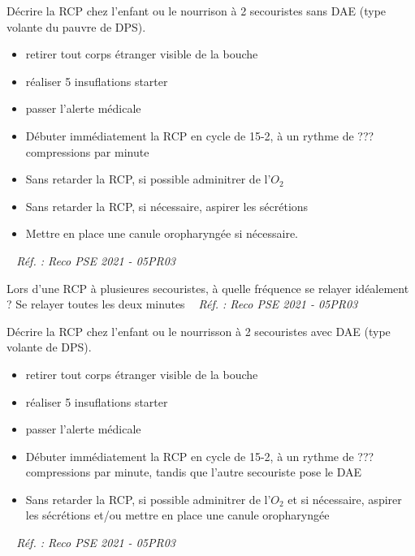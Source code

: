\documentclass[grid,avery5371,landscape]{flashcards}
\makeatletter
\newcounter{nocarte}
\newcommand{\categ}[1]{%
  \def\@categ{#1}%
  \setcounter{nocarte}{0}%
}
\newcommand{\source}[1]{%
  \medskip
  \itshape%
   ~ \hfill Réf. : #1}
\makeatother
\begin{document}
\color[HTML]{003273}
\categ{PSE}
\begin{flashcard}[CAT]{
 Décrire la RCP chez l'enfant ou le nourrison à 2 secouristes sans DAE (type volante du pauvre de DPS).   }
  \begin{itemize} \item retirer tout corps étranger visible de la bouche \item réaliser 5 insuflations starter \item passer l'alerte médicale \item Débuter immédiatement la RCP en cycle de 15-2, à un rythme de ??? compressions par minute \item Sans retarder la RCP, si possible adminitrer de l'$O_2$ \item Sans retarder la RCP, si nécessaire, aspirer les sécrétions \item Mettre en place une canule oropharyngée si nécessaire. \end{itemize}
  \source{Reco PSE 2021 - 05PR03}
\end{flashcard}


\color[HTML]{003273}
\categ{PSE}
\begin{flashcard}[CAT]{
 Lors d'une RCP à plusieures secouristes, à quelle fréquence se relayer idéalement ?   }
  Se relayer toutes les deux minutes
  \source{Reco PSE 2021 - 05PR03}
\end{flashcard}


\color[HTML]{003273}
\categ{PSE}
\begin{flashcard}[CAT]{
 Décrire la RCP chez l'enfant ou le nourrisson à 2 secouristes avec DAE (type volante de DPS).   }
  \begin{itemize} 
\item retirer tout corps étranger visible de la bouche 
\item réaliser 5 insuflations starter 
\item passer l'alerte médicale 
\item Débuter immédiatement la RCP en cycle de 15-2, à un rythme de ??? compressions par minute, tandis que l'autre secouriste pose le DAE 
\item Sans retarder la RCP, si possible adminitrer de l'$O_2$ et si nécessaire, aspirer les sécrétions et/ou mettre en place une canule oropharyngée\end{itemize} 
  \source{Reco PSE 2021 - 05PR03}
\end{flashcard}
\end{document}
